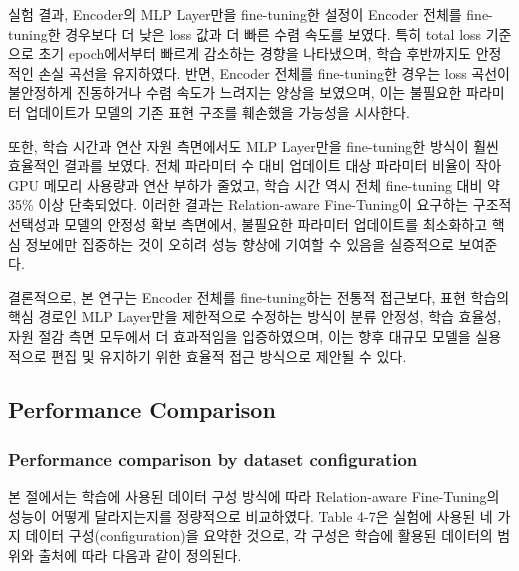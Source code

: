 \documentclass[a4paper,fleqn]{cas-sc}
\begin{document}
실험 결과, Encoder의 MLP Layer만을 fine-tuning한 설정이 Encoder 전체를 fine-tuning한 경우보다 더 낮은 loss 값과 더 빠른 수렴 속도를 보였다. 특히 total loss 기준으로 초기 epoch에서부터 빠르게 감소하는 경향을 나타냈으며, 학습 후반까지도 안정적인 손실 곡선을 유지하였다. 반면, Encoder 전체를 fine-tuning한 경우는 loss 곡선이 불안정하게 진동하거나 수렴 속도가 느려지는 양상을 보였으며, 이는 불필요한 파라미터 업데이트가 모델의 기존 표현 구조를 훼손했을 가능성을 시사한다.

또한, 학습 시간과 연산 자원 측면에서도 MLP Layer만을 fine-tuning한 방식이 훨씬 효율적인 결과를 보였다. 전체 파라미터 수 대비 업데이트 대상 파라미터 비율이 작아 GPU 메모리 사용량과 연산 부하가 줄었고, 학습 시간 역시 전체 fine-tuning 대비 약 35\% 이상 단축되었다. 이러한 결과는 Relation-aware Fine-Tuning이 요구하는 구조적 선택성과 모델의 안정성 확보 측면에서, 불필요한 파라미터 업데이트를 최소화하고 핵심 정보에만 집중하는 것이 오히려 성능 향상에 기여할 수 있음을 실증적으로 보여준다.

결론적으로, 본 연구는 Encoder 전체를 fine-tuning하는 전통적 접근보다, 표현 학습의 핵심 경로인 MLP Layer만을 제한적으로 수정하는 방식이 분류 안정성, 학습 효율성, 자원 절감 측면 모두에서 더 효과적임을 입증하였으며, 이는 향후 대규모 모델을 실용적으로 편집 및 유지하기 위한 효율적 접근 방식으로 제안될 수 있다.

\subsection{Performance Comparison}

\subsubsection{Performance comparison by dataset configuration}

본 절에서는 학습에 사용된 데이터 구성 방식에 따라 Relation-aware Fine-Tuning의 성능이 어떻게 달라지는지를 정량적으로 비교하였다. Table 4-7은 실험에 사용된 네 가지 데이터 구성(configuration)을 요약한 것으로, 각 구성은 학습에 활용된 데이터의 범위와 출처에 따라 다음과 같이 정의된다.
\end{document}
